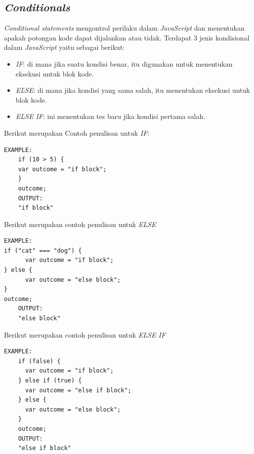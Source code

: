 \subsection{\textit{Conditionals}}
\label{sec: Conditionals}
    \textit{Conditional statements} mengontrol perilaku dalam \textit{JavaScript} dan menentukan apakah potongan kode dapat dijalankan atau tidak\cite{javascriptlearn}. Terdapat 3 jenis kondisional dalam \textit{JavaScript} yaitu sebagai berikut: 
    \begin{itemize}
        \item \textit{IF}: di mana jika suatu kondisi benar, itu digunakan untuk menentukan eksekusi untuk blok kode.
        \item \textit{ELSE}: di mana jika kondisi yang sama salah, itu menentukan eksekusi untuk blok kode.
        \item \textit{ELSE IF}: ini menentukan tes baru jika kondisi pertama salah.
    \end{itemize}
    Berikut merupakan Contoh penulisan untuk \textit{IF}: 
    \begin{lstlisting}[basicstyle=\ttfamily, frame=single,
    columns=fullflexible, breaklines=true, numbers=none]
    EXAMPLE:
    if (10 > 5) {
    var outcome = "if block";
    }
    outcome;
    OUTPUT:
    "if block"
    \end{lstlisting}
    Berikut merupakan contoh penulisan untuk \textit{ELSE}
    \begin{lstlisting}[basicstyle=\ttfamily, frame=single,
    columns=fullflexible, breaklines=true, numbers=none]
    EXAMPLE:
if ("cat" === "dog") {
      var outcome = "if block";
} else {
      var outcome = "else block";
}
outcome;
    OUTPUT:
    "else block"
    \end{lstlisting}
    Berikut merupakan contoh penulisan untuk \textit{ELSE IF}
    \begin{lstlisting}[basicstyle=\ttfamily, frame=single,
    columns=fullflexible, breaklines=true, numbers=none]
    EXAMPLE:
    if (false) {
      var outcome = "if block";
    } else if (true) {
      var outcome = "else if block";
    } else {
      var outcome = "else block";
    }
    outcome;
    OUTPUT:
    "else if block"
    \end{lstlisting}

